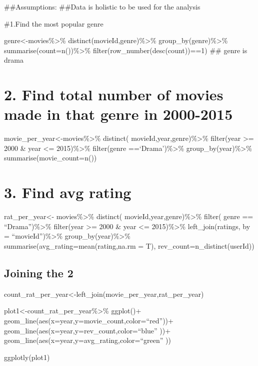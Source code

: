 \documentclass[]{article}
\begin{document}
\#\#Assumptions: \#\#Data is holistic to be used for the analysis

\#1.Find the most popular genre

genre\textless{}-movies\%\textgreater{}\%
distinct(movieId,genre)\%\textgreater{}\%
group\_by(genre)\%\textgreater{}\%
summarise(count=n())\%\textgreater{}\%
filter(row\_number(desc(count))==1) \#\# genre is drama

\hypertarget{find-total-number-of-movies-made-in-that-genre-in-2000-2015-1}{%
\section{2. Find total number of movies made in that genre in
2000-2015}\label{find-total-number-of-movies-made-in-that-genre-in-2000-2015-1}}

movie\_per\_year\textless{}-movies\%\textgreater{}\% distinct(
movieId,year,genre)\%\textgreater{}\% filter(year \textgreater{}= 2000
\& year \textless{}= 2015)\%\textgreater{}\% filter(genre
==`Drama')\%\textgreater{}\% group\_by(year)\%\textgreater{}\%
summarise(movie\_count=n())

\hypertarget{find-avg-rating-1}{%
\section{3. Find avg rating}\label{find-avg-rating-1}}

rat\_per\_year\textless{}- movies\%\textgreater{}\% distinct(
movieId,year,genre)\%\textgreater{}\% filter( genre ==
``Drama'')\%\textgreater{}\% filter(year \textgreater{}= 2000 \& year
\textless{}= 2015)\%\textgreater{}\% left\_join(ratings, by =
``movieId'')\%\textgreater{}\% group\_by(year)\%\textgreater{}\%
summarise(avg\_rating=mean(rating,na.rm = T),
rev\_count=n\_distinct(userId))

\hypertarget{joining-the-2}{%
\subsection{Joining the 2}\label{joining-the-2}}

count\_rat\_per\_year\textless{}-left\_join(movie\_per\_year,rat\_per\_year)

plot1\textless{}-count\_rat\_per\_year\%\textgreater{}\% ggplot()+
geom\_line(aes(x=year,y=movie\_count,color=``red''))+
geom\_line(aes(x=year,y=rev\_count,color=``blue'' ))+
geom\_line(aes(x=year,y=avg\_rating,color=``green'' ))

ggplotly(plot1)
\end{document}
